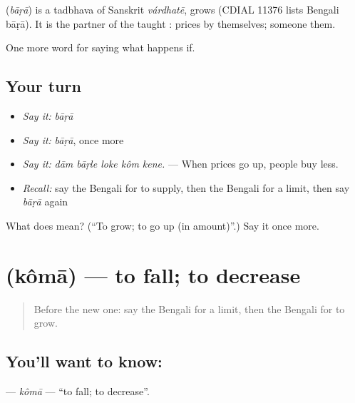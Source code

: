\begin{cousinweb}
\textbf{} (\emph{bāṛā}) is a tadbhava of Sanskrit \emph{várdhatē}, grows (CDIAL 11376 lists Bengali bāṛā). It is the partner of the taught : prices  by themselves; someone  them.
\end{cousinweb}

\begin{grammarlens}[title={What you've built}]
One more word for saying what happens if.
\end{grammarlens}

\subsection*{Your turn}
\begin{itemize}
\raggedright
  \item \emph{Say it:} \emph{bāṛā}
  \item \emph{Say it:} \emph{bāṛā}, once more
  \item \emph{Say it:} \emph{dām bāṛle loke kôm kene.} — When prices go up, people buy less.
  \item \emph{Recall:} say the Bengali for to supply, then the Bengali for a limit, then say \emph{bāṛā} again
\end{itemize}

\begin{tcolorbox}[breakable,colback=teal!4,colframe=teal!35!black,title={Before you move on}]
What does  mean? (\textquotedblleft{}To grow; to go up (in amount)\textquotedblright{}.) Say it once more.
\end{tcolorbox}
\section[\texorpdfstring{\bn{কমা} (kômā)}{কমা (kômā)}]{ (kômā) — to fall; to decrease}

\label{lesson:BN-C372-koma}



\begin{quote}
Before the new one: say the Bengali for a limit, then the Bengali for to grow.
\end{quote}

\subsection*{You'll want to know: }
\textbf{} — \emph{kômā} — \textquotedblleft{}to fall; to decrease\textquotedblright{}.

